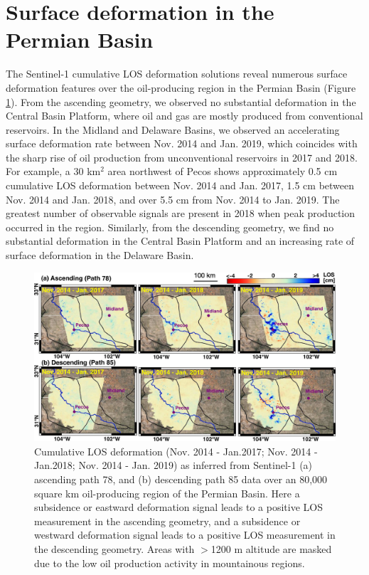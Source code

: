 \section{Surface deformation in the Permian Basin}
The Sentinel-1 cumulative LOS deformation solutions reveal numerous surface deformation features over the oil-producing region in the Permian Basin (Figure \ref{fig:insar-los}). From the ascending geometry, we observed no substantial deformation in the Central Basin Platform, where oil and gas are mostly produced from conventional reservoirs. In the Midland and Delaware Basins, we observed an accelerating surface deformation rate between Nov. 2014 and Jan. 2019, which coincides with the sharp rise of oil production from unconventional reservoirs in 2017 and 2018. For example, a 30 km$^2 $ area northwest of Pecos shows approximately 0.5 cm cumulative LOS deformation between Nov. 2014 and Jan. 2017, 1.5 cm between Nov. 2014 and Jan. 2018, and over 5.5 cm from Nov. 2014 to Jan. 2019. The greatest number of observable signals are present in 2018 when peak production occurred in the region. Similarly, from the descending geometry, we find no substantial deformation in the Central Basin Platform and an increasing rate of surface deformation in the Delaware Basin. 


\begin{figure}
	\centering
	\includegraphics[width=.99\linewidth]{figures/chapter4-grl/figure3-los-insar-small.pdf}
	\caption[Cumulative LOS deformation for path 78 and path 85]{Cumulative LOS deformation (Nov. 2014 - Jan.2017; Nov. 2014 - Jan.2018; Nov. 2014 - Jan. 2019) as inferred from Sentinel-1 (a) ascending path 78, and (b) descending path 85 data over an 80,000 square km oil-producing region of the Permian Basin. Here a subsidence or eastward deformation signal leads to a positive LOS measurement in the ascending geometry, and a subsidence or westward deformation signal leads to a positive LOS measurement in the descending geometry. Areas with $>$1200 m altitude are masked due to the low oil production activity in mountainous regions.}
	\label{fig:insar-los}
\end{figure}

